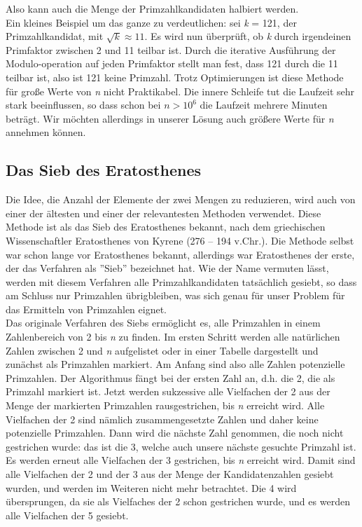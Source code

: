 \documentclass[course=erap]{aspdoc}
\begin{document}
Also kann auch die Menge der Primzahlkandidaten halbiert werden.\\Ein kleines Beispiel um das ganze zu verdeutlichen: sei \textit{k} = 121, der Primzahlkandidat, mit $\sqrt{k} \approx 11$. Es wird nun überprüft, ob \textit{k} durch irgendeinen Primfaktor zwischen 2 und 11 teilbar ist. Durch die iterative Ausführung der Modulo-operation auf jeden Primfaktor stellt man fest, dass 121 durch die 11 teilbar ist, also ist 121 keine Primzahl. 
Trotz Optimierungen ist diese Methode für große Werte von \textit{n} nicht Praktikabel. 
Die innere Schleife tut die Laufzeit sehr stark beeinflussen, so dass schon bei $n>10^6$ die Laufzeit mehrere Minuten beträgt. 
Wir möchten allerdings in unserer Lösung auch größere Werte für \textit{n} annehmen können.
\subsection{Das Sieb des Eratosthenes}
Die Idee, die Anzahl der Elemente der zwei Mengen zu reduzieren, wird auch von einer der ältesten und einer der relevantesten Methoden 
verwendet. Diese Methode ist als das Sieb des Eratosthenes bekannt, nach dem griechischen Wissenschaftler Eratosthenes von Kyrene (276 – 194 v.Chr.). 
Die Methode selbst war schon lange vor Eratosthenes bekannt, allerdings war Eratosthenes der erste, der das Verfahren als ''Sieb'' bezeichnet hat. 
Wie der Name vermuten lässt, werden mit diesem Verfahren alle Primzahlkandidaten tatsächlich gesiebt, so dass am Schluss nur Primzahlen übrigbleiben, 
was sich genau für unser Problem für das Ermitteln von Primzahlen eignet.\\Das originale Verfahren des Siebs ermöglicht es, alle Primzahlen in einem Zahlenbereich von 2 bis \textit{n} zu finden. Im ersten Schritt werden alle natürlichen Zahlen zwischen 2 und \textit{n} aufgelistet oder in einer Tabelle dargestellt 
und zunächst als Primzahlen markiert. Am Anfang sind also alle Zahlen potenzielle Primzahlen. 
Der Algorithmus fängt bei der ersten Zahl an, d.h. die 2, die als Primzahl markiert ist. 
Jetzt werden sukzessive alle Vielfachen der 2 aus der Menge der markierten Primzahlen rausgestrichen, bis \textit{n} erreicht wird. 
Alle Vielfachen der 2 sind nämlich zusammengesetzte Zahlen und daher keine potenzielle Primzahlen. Dann wird die nächste Zahl genommen, 
die noch nicht gestrichen wurde: das ist die 3, welche auch unsere nächste gesuchte Primzahl ist. 
Es werden erneut alle Vielfachen der 3 gestrichen, bis \textit{n} erreicht wird. 
Damit sind alle Vielfachen der 2 und der 3 aus der Menge der Kandidatenzahlen gesiebt wurden, und werden im Weiteren nicht mehr betrachtet. Die 4 wird übersprungen, da sie als Vielfaches der 2 schon gestrichen wurde, und es werden alle Vielfachen der 5 gesiebt.  
\end{document}
